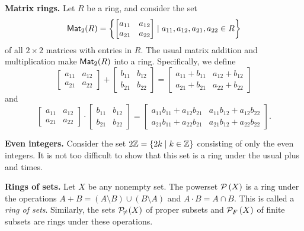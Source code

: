 \begin{examples}
\item \textbf{Matrix rings.} Let \(R\) be a ring, and consider the set \[ \mathsf{Mat}_{2}(R) = \left\{ \begin{bmatrix} a_{11} & a_{12} \\ a_{21} & a_{22} \end{bmatrix} \mid a_{11}, a_{12}, a_{21}, a_{22} \in R \right\} \] of all \(2 \times 2\) matrices with entries in \(R\).
The usual matrix addition and multiplication make \(\mathsf{Mat}_{2}(R)\) into a ring.
Specifically, we define \[\begin{bmatrix} a_{11} & a_{12} \\ a_{21} & a_{22} \end{bmatrix} + \begin{bmatrix} b_{11} & b_{12} \\ b_{21} & b_{22} \end{bmatrix} = \begin{bmatrix} a_{11} + b_{11} & a_{12} + b_{12} \\ a_{21} + b_{21} & a_{22} + b_{22} \end{bmatrix}\] and \[\begin{bmatrix} a_{11} & a_{12} \\ a_{21} & a_{22} \end{bmatrix} \cdot \begin{bmatrix} b_{11} & b_{12} \\ b_{21} & b_{22} \end{bmatrix} = \begin{bmatrix} a_{11}b_{11} + a_{12}b_{21} & a_{11}b_{12} + a_{12}b_{22} \\ a_{21}b_{11} + a_{22}b_{21} & a_{21}b_{12} + a_{22}b_{22} \end{bmatrix}.\]

\item \textbf{Even integers.} Consider the set \(2\mathbb{Z} = \{ 2k \mid k \in \mathbb{Z} \}\) consisting of only the even integers.
It is not too difficult to show that this set is a ring under the usual plus and times.

\item \textbf{Rings of sets.} \label{examp:rings-of-sets}  Let \(X\) be any nonempty set.
The powerset \(\mathcal{P}\left(X\right)\) is a ring under the operations \(A + B = (A \setminus B) \cup (B \setminus A)\) and \(A \cdot B = A \cap B\).
This is called a \emph{ring of sets}.
Similarly, the sets \(\mathcal{P}_{\!\neq\!}\left(X\right)\) of proper subsets and \(\mathcal{P}_F\left(X\right)\) of finite subsets are rings under these operations.
\end{examples}


